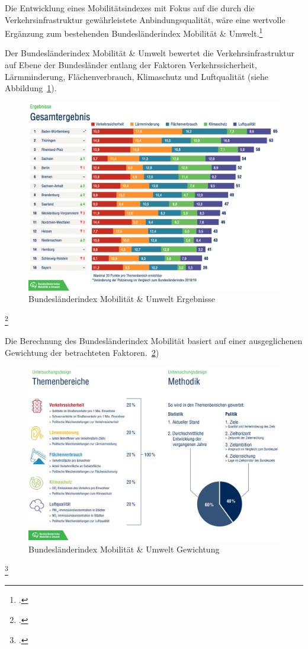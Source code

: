 Die Entwicklung eines Mobilitätsindexes mit Fokus auf die durch die Verkehrsinfrastruktur gewährleistete Anbindungsqualität, wäre eine wertvolle Ergänzung zum bestehenden Bundesländerindex Mobilität \& Umwelt.\footcite{Bundeslaenderindex:1}

Der Bundesländerindex Mobilität \& Umwelt bewertet die Verkehrsinfrastruktur auf Ebene der Bundesländer entlang der Faktoren Verkehrssicherheit, Lärmminderung, Flächenverbrauch, Klimaschutz und Luftqualität (siehe Abbildung~\ref{mob-index2020}).

\begin{figure}[H]
\includegraphics[width=14cm]{abbildungen/mob-index2020}
\centering
\caption[Bundesländerindex Mobilität \& Umwelt Ergebnisse]{Bundesländerindex Mobilität \& Umwelt Ergebnisse\footnotemark}
\label{mob-index2020}
\end{figure}
\footcitetext{Bundeslaenderindex:1}

Die Berechnung des Bundesländerindex Mobilität basiert auf einer ausgeglichenen Gewichtung der betrachteten Faktoren.~\ref{mob-index2018-Verteilung})

\begin{figure}[H]
\includegraphics[width=14cm]{abbildungen/mob-index2018-Verteilung}
\centering
\caption[Bundesländerindex Mobilität \& Umwelt Gewichtung]{Bundesländerindex Mobilität \& Umwelt Gewichtung\footnotemark}
\label{mob-index2018-Verteilung}
\end{figure}
\footcitetext{Bundeslaenderindex:1}

